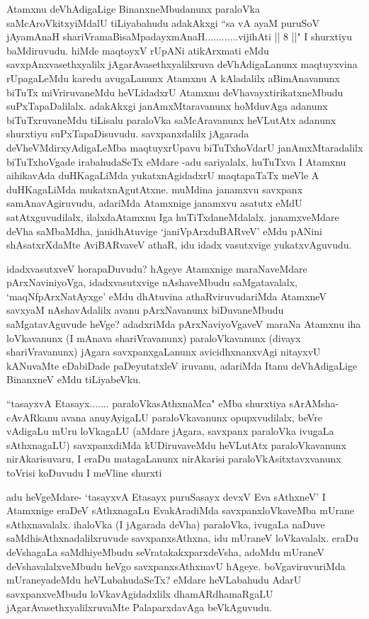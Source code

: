 \begin{artha}
Atamxnu deVhAdigaLige BinanxneMbudanunx paraloVka saMcAroVkitxyiMdalU tiLiyabahudu adakAkxgi ``sa vA ayaM puruSoV jAyamAnaH shariVramaBisaMpadayxmAnaH............vijihAti || 8 ||" I shurxtiyu baMdiruvudu. hiMde maqtoyxV rUpANi atikArxmati eMdu savxpAnxvasethxyalilx jAgarAvasethxyalilxruva deVhAdigaLanunx maqtuyxvina rUpagaLeMdu karedu avugaLanunx Atamxnu A kAladalilx aBimAnavanunx biTuTx miVriruvaneMdu heVLidadxrU Atamxnu deVhavayxtirikatxneMbudu suPxTapaDalilalx. adakAkxgi janAmxMtaravanunx hoMduvAga adanunx biTuTxruvaneMdu tiLisalu paraloVka saMcAravanunx heVLutAtx adanunx shurxtiyu suPxTapaDisuvudu. savxpanxdalilx jAgarada deVheVMdirxyAdigaLeMba maqtuyxrUpavu biTuTxhoVdarU janAmxMtaradalilx biTuTxhoVgade irabahudaSeTx eMdare -adu sariyalalx, huTuTxva I Atamxnu aihikavAda duHKagaLiMda yukatxnAgidadxrU maqtapaTaTx meVle A duHKagaLiMda mukatxnAgutAtxne. muMdina janamxvu savxpanx samAnavAgiruvudu, adariMda Atamxnige janamxvu asatutx eMdU satAtxguvudilalx, ilalxdaAtamxnu Iga huTiTxdaneMdalalx. janamxveMdare deVha saMbaMdha, janidhAtuvige `janiVpArxduBARveV' eMdu pANini shAsatxrXdaMte AviBARvaveV athaR, idu idadx vasutxvige yukatxvAguvudu. 
\end{artha}%

\begin{artha}
idadxvasutxveV horapaDuvudu? hAgeye Atamxnige maraNaveMdare pArxNaviniyoVga, idadxvasutxvige nAshaveMbudu saMgatavalalx, `maqNfpArxNatAyxge' eMdu dhAtuvina athaRviruvudariMda AtamxneV savxyaM nAshavAdalilx avanu pArxNavanunx biDuvaneMbudu saMgatavAguvude heVge? adadxriMda pArxNaviyoVgaveV maraNa Atamxnu iha loVkavanunx (I mAnava shariVravanunx) paraloVkavanunx (divayx shariVravanunx) jAgara savxpanxgaLanunx avicidhxnanxvAgi nitayxvU kANuvaMte eDabiDade paDeyutatxleV iruvanu, adariMda Itanu deVhAdigaLige BinanxneV eMdu tiLiyabeVku. 
\end{artha}


\begin{artha}
``tasayxvA Etasayx....... paraloVkasAthxnaMca" eMba shurxtiya sArAMsha- cAvARkanu avana anuyAyigaLU paraloVkavanunx opupxvudilalx, beVre vAdigaLu mUru loVkagaLU (aMdare jAgara, savxpanx paraloVka ivugaLa sAthxnagaLU) savxpanxdiMda kUDiruvaveMdu heVLutAtx paraloVkavanunx nirAkarisuvaru, I eraDu matagaLanunx nirAkarisi paraloVkAsitxtavxvanunx toVrisi koDuvudu I meVline shurxti
\end{artha}

\begin{artha}
adu heVgeMdare- `tasayxvA Etasayx puruSasayx devxV Eva sAthxneV' I Atamxnige eraDeV sAthxnagaLu EvakAradiMda savxpanxloVkaveMba mUrane sAthxnavalalx. ihaloVka (I jAgarada deVha) paraloVka, ivugaLa naDuve saMdhisAthxnadalilxruvude savxpanxsAthxna, idu mUraneV loVkavalalx. eraDu deVshagaLa saMdhiyeMbudu seVratakakxparxdeVsha, adoMdu mUraneV deVshavalalxveMbudu heVgo savxpanxsAthxnavU hAgeye. boVgaviruvuriMda mUraneyadeMdu heVLubahudaSeTx? eMdare heVLabahudu AdarU savxpanxveMbudu loVkavAgidadxlilx dhamARdhamaRgaLU jAgarAvasethxyalilxruvaMte PalaparxdavAga beVkAguvudu. 
\end{artha}

